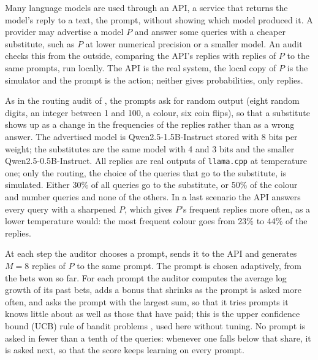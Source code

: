 \documentclass[12pt]{article}
\theoremstyle{remark}
\begin{document}
Many language models are used through an API, a service that returns the
model's reply to a text, the prompt, without showing which model produced it.
A provider may advertise a model $P$ and answer some queries with a cheaper
substitute, such as $P$ at lower numerical precision or a smaller model. An
audit checks this from the outside, comparing the API's replies with replies
of $P$ to the same prompts, run locally. The API is the real system, the local
copy of $P$ is the simulator and the prompt is the action; neither gives
probabilities, only replies.

As in the routing audit of \citet{cortinovis2026slice}, the prompts ask for
random output (eight random digits, an integer between 1 and 100, a colour,
six coin flips), so that a substitute shows up as a change in the frequencies
of the replies rather than as a wrong answer. The advertised model is
Qwen2.5-1.5B-Instruct \citep{qwen2024qwen25} stored with 8 bits per weight;
the substitutes are the same model with 4 and 3 bits and the smaller
Qwen2.5-0.5B-Instruct. All replies are real outputs of \texttt{llama.cpp}
\citep{gerganov2023llamacpp} at temperature one; only the routing, the choice
of the queries that go to the substitute, is simulated. Either 30\% of all
queries go to the substitute, or 50\% of the colour and number queries and
none of the others. In a last scenario the API answers every query with a
sharpened $P$, which gives $P$'s frequent replies more often, as a lower
temperature would: the most frequent colour goes from 23\% to 44\% of the
replies.

At each step the auditor chooses a prompt, sends it to the API and generates
$M = 8$ replies of $P$ to the same prompt. The prompt is chosen adaptively,
from the bets won so far. For each prompt the auditor computes the average log
growth of its past bets, adds a bonus that shrinks as the prompt is asked more
often, and asks the prompt with the largest sum, so that it tries prompts it
knows little about as well as those that have paid; this is the upper
confidence bound (UCB) rule of bandit problems \citep{lattimore2020bandit},
used here without tuning. No prompt is asked in fewer than a tenth of the
queries: whenever one falls below that share, it is asked next, so that the
score keeps learning on every prompt.
\end{document}

